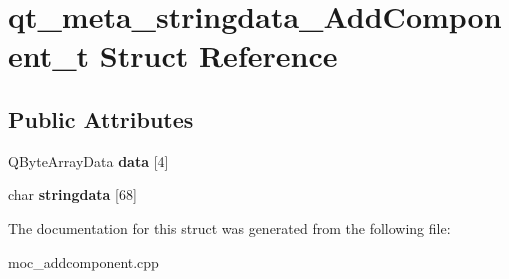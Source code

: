 \hypertarget{structqt__meta__stringdata__AddComponent__t}{\section{qt\-\_\-meta\-\_\-stringdata\-\_\-\-Add\-Component\-\_\-t Struct Reference}
\label{structqt__meta__stringdata__AddComponent__t}
}
\subsection*{Public Attributes}
\begin{DoxyCompactItemize}
\item 
\hypertarget{structqt__meta__stringdata__AddComponent__t_ae3fc0f4a6112d54b8aada2f90bbc1f51}{Q\-Byte\-Array\-Data {\bfseries data} \mbox{[}4\mbox{]}}\label{structqt__meta__stringdata__AddComponent__t_ae3fc0f4a6112d54b8aada2f90bbc1f51}

\item 
\hypertarget{structqt__meta__stringdata__AddComponent__t_ad7b2110ba94f0cb62946737463df538f}{char {\bfseries stringdata} \mbox{[}68\mbox{]}}\label{structqt__meta__stringdata__AddComponent__t_ad7b2110ba94f0cb62946737463df538f}

\end{DoxyCompactItemize}


The documentation for this struct was generated from the following file\-:\begin{DoxyCompactItemize}
\item 
moc\-\_\-addcomponent.\-cpp\end{DoxyCompactItemize}

